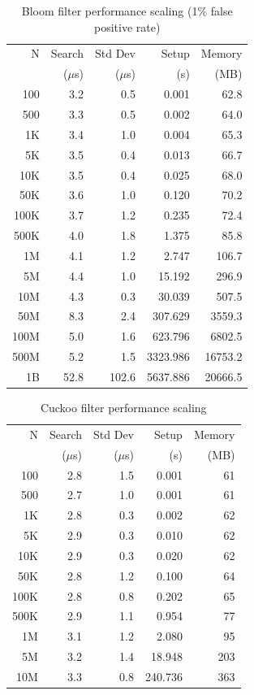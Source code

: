 \documentclass[sigconf]{acmart}
\begin{document}
\begin{table}[h]
\caption{Bloom filter performance scaling (1\% false positive rate)}
\scriptsize
\begin{tabular}{rrrrr}
\hline
N & Search & Std Dev & Setup & Memory \\
 & ($\mu$s) & ($\mu$s) & (s) & (MB) \\
\hline
100 & 3.2 & 0.5 & 0.001 & 62.8 \\
500 & 3.3 & 0.5 & 0.002 & 64.0 \\
1K & 3.4 & 1.0 & 0.004 & 65.3 \\
5K & 3.5 & 0.4 & 0.013 & 66.7 \\
10K & 3.5 & 0.4 & 0.025 & 68.0 \\
50K & 3.6 & 1.0 & 0.120 & 70.2 \\
100K & 3.7 & 1.2 & 0.235 & 72.4 \\
500K & 4.0 & 1.8 & 1.375 & 85.8 \\
1M & 4.1 & 1.2 & 2.747 & 106.7 \\
5M & 4.4 & 1.0 & 15.192 & 296.9 \\
10M & 4.3 & 0.3 & 30.039 & 507.5 \\
50M & 8.3 & 2.4 & 307.629 & 3559.3 \\
100M & 5.0 & 1.6 & 623.796 & 6802.5 \\
500M & 5.2 & 1.5 & 3323.986 & 16753.2 \\
1B & 52.8 & 102.6 & 5637.886 & 20666.5 \\
\hline
\end{tabular}
\label{tab:bloom-results}
\end{table}

\begin{table}[h]
\caption{Cuckoo filter performance scaling}
\scriptsize
\begin{tabular}{rrrrr}
\hline
N & Search & Std Dev & Setup & Memory \\
 & ($\mu$s) & ($\mu$s) & (s) & (MB) \\
\hline
100 & 2.8 & 1.5 & 0.001 & 61 \\
500 & 2.7 & 1.0 & 0.001 & 61 \\
1K & 2.8 & 0.3 & 0.002 & 62 \\
5K & 2.9 & 0.3 & 0.010 & 62 \\
10K & 2.9 & 0.3 & 0.020 & 62 \\
50K & 2.8 & 1.2 & 0.100 & 64 \\
100K & 2.8 & 0.8 & 0.202 & 65 \\
500K & 2.9 & 1.1 & 0.954 & 77 \\
1M & 3.1 & 1.2 & 2.080 & 95 \\
5M & 3.2 & 1.4 & 18.948 & 203 \\
10M & 3.3 & 0.8 & 240.736 & 363 \\
\hline
\end{tabular}
\label{tab:cuckoo-results}
\end{table}
\end{document}
